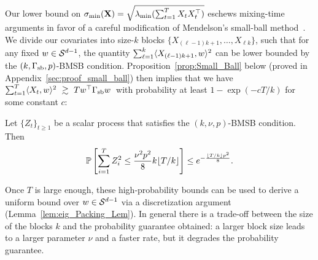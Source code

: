 Our lower bound on $\sigma_{\min}(\mathbf{X}) = \sqrt{\lambda_{\min}(\sum_{t=1}^TX_tX_t^\top)}$ eschews mixing-time arguments in favor of a careful modification of Mendelson's small-ball method~\citep{mendelson14b}. %
We divide our covariates into size-$k$ blocks $\{X_{(\ell-1) k + 1},\dots,X_{\ell k}\}$, such that for  any fixed $w \in \mathcal{S}^{d-1}$, the quantity $\sum_{\ell=1}^k \langle X_{(\ell-1) k + 1}, w \rangle^2$ can be lower bounded by the $(k, \Gamma_{\mathrm{sb}}, p)$-BMSB condition. Proposition~\ref{prop:Small_Ball} below (proved in Appendix~\ref{sec:proof_small_ball}) then implies that we have $\sum_{t=1}^T \langle X_t, w \rangle^2~\gtrsim~T w^\top \Gamma_{\mathrm{sb}} w$~with probability at least $1 - \exp( - c T/k)$ for some constant $c$:
\begin{prop}\label{prop:Small_Ball} Let $\{Z_t\}_{t\geq 1}$ be  a scalar process  that satisfies the $(k,\nu,p)$-BMSB condition. Then
    \begin{eqnarray}
    \mathbb{P}\left[\sum_{i=1}^T Z_i^2 \le \frac{\nu^2p^2}{8} k\lfloor T/k\rfloor\right] \leq   e^{-\frac{\lfloor T/k\rfloor p^2}{8}}.
    \end{eqnarray}
 \end{prop}
Once $T$ is large enough, these high-probability bounds can be used to derive a uniform bound over $w \in \mathcal{S}^{d-1}$ via a discretization argument (Lemma~\ref{lem:eig_Packing_Lem}).  In general there is a trade-off between the size of the blocks $k$ and the probability guarantee obtained: a larger block size leads to a larger
parameter $\nu$ and a faster rate, but it degrades the probability guarantee.





